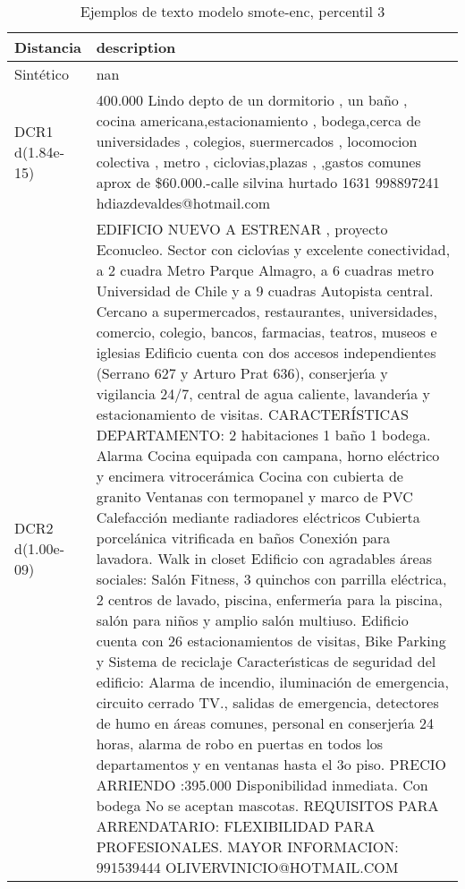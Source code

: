 \begin{table}[H]
\centering
\fontsize{10}{14}\selectfont
\caption{Ejemplos de texto modelo smote-enc, percentil 3}
\label{table-example-economicos-b-2-smote-enc-3p-text}
\begin{tabular}{|l|m{35em}|}
\hline
\rowcolor[gray]{0.8}
Distancia & description \\
\hline Sintético & nan \\
\hline DCR1 d(1.84e-15) & 400.000 Lindo depto de un dormitorio , un ba\~no , cocina americana,estacionamiento , bodega,cerca de universidades , colegios, suermercados , locomocion colectiva , metro , ciclovias,plazas , ,gastos comunes aprox de \$60.000.-calle silvina hurtado 1631 998897241 hdiazdevaldes@hotmail.com \\
\hline DCR2 d(1.00e-09) & EDIFICIO NUEVO A ESTRENAR , proyecto Econucleo. 
Sector con ciclov{\'\i}as y excelente conectividad, a 2 cuadra Metro Parque Almagro, a 6 cuadras metro Universidad de Chile y a 9 cuadras Autopista central. Cercano a supermercados, restaurantes, universidades, comercio, colegio, bancos, farmacias, teatros, museos e iglesias
Edificio cuenta con dos accesos independientes (Serrano 627 y Arturo Prat 636), conserjer{\'\i}a y vigilancia 24/7, central de agua caliente, lavander{\'\i}a y estacionamiento de visitas.
CARACTER\'ISTICAS DEPARTAMENTO:
2 habitaciones
1 ba\~no
1 bodega. 
Alarma
Cocina equipada con campana, horno el\'ectrico y encimera vitrocer\'amica
Cocina con cubierta de granito
Ventanas con termopanel y marco de PVC
Calefacci\'on mediante radiadores el\'ectricos
Cubierta porcel\'anica vitrificada en ba\~nos
Conexi\'on para lavadora.
Walk in closet
Edificio con agradables \'areas sociales: Sal\'on Fitness, 3 quinchos con parrilla el\'ectrica, 2 centros de lavado, piscina, enfermer{\'\i}a para la piscina, sal\'on para ni\~nos y amplio sal\'on multiuso.
Edificio cuenta con 26 estacionamientos de visitas, Bike Parking y Sistema de reciclaje
Caracter{\'\i}sticas de seguridad del edificio: Alarma de incendio, iluminaci\'on de emergencia, circuito cerrado TV., salidas de emergencia, detectores de humo en \'areas comunes, personal en conserjer{\'\i}a 24 horas, alarma de robo en puertas en todos los departamentos y en ventanas hasta el 3o piso.
PRECIO ARRIENDO :395.000
Disponibilidad inmediata.
Con bodega 
No se aceptan mascotas.
REQUISITOS PARA ARRENDATARIO:
FLEXIBILIDAD PARA PROFESIONALES.
MAYOR INFORMACION:
991539444
OLIVERVINICIO@HOTMAIL.COM \\
\hline
\end{tabular}
\end{table}

